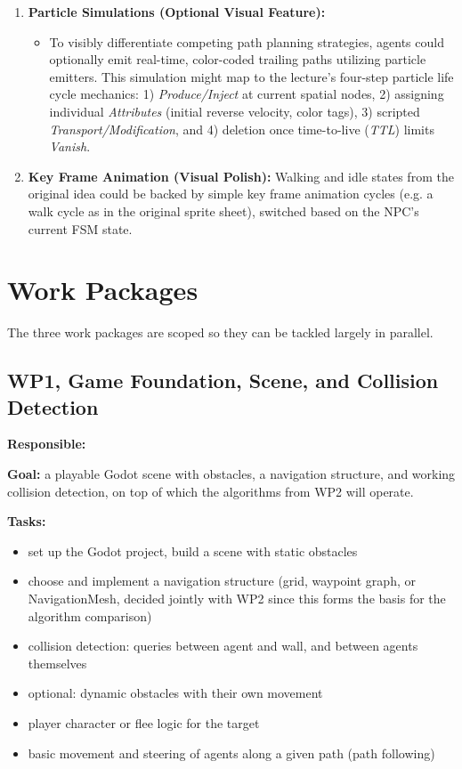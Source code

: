 \documentclass[11pt,a4paper]{article}
\begin{document}
\begin{enumerate}[leftmargin=1.4em]
  \item \textbf{Particle Simulations (Optional Visual Feature):} 
  \begin{itemize}
    \item To visibly differentiate competing path planning strategies, agents could optionally emit real-time, color-coded trailing paths utilizing particle emitters. This simulation might map to the lecture's four-step particle life cycle mechanics: 1) \textit{Produce/Inject} at current spatial nodes, 2) assigning individual \textit{Attributes} (initial reverse velocity, color tags), 3) scripted \textit{Transport/Modification}, and 4) deletion once time-to-live (\textit{TTL}) limits \textit{Vanish}.
  \end{itemize}
  
  \item \textbf{Key Frame Animation (Visual Polish):}
  Walking and idle states from the original idea could be backed by simple
  key frame animation cycles (e.g. a walk cycle as in the original
  sprite sheet), switched based on the NPC's current FSM state.
\end{enumerate}

\newpage

\section{Work Packages}

The three work packages are scoped so they can be tackled largely in
parallel. 

\subsection*{WP1, Game Foundation, Scene, and Collision Detection}

\textbf{Responsible:} \underline{\hspace{4cm}}

\textbf{Goal:} a playable Godot scene with obstacles, a navigation
structure, and working collision detection, on top of which the
algorithms from WP2 will operate.

\textbf{Tasks:}
\begin{itemize}[leftmargin=1.2em]
  \item set up the Godot project, build a scene with static obstacles
  \item choose and implement a navigation structure (grid, waypoint graph,
  or NavigationMesh, decided jointly with WP2 since this forms the basis
  for the algorithm comparison)
  \item collision detection: queries between agent and wall, and between
  agents themselves
  \item optional: dynamic obstacles with their own movement
  \item player character or flee logic for the target
  \item basic movement and steering of agents along a given path (path
  following)
\end{itemize}
\end{document}
